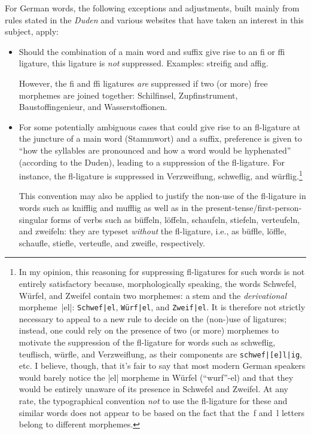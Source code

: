 \documentclass[11pt]{article}
\begin{document}
For German words, the following exceptions and adjustments, built mainly from rules stated in the \emph{Duden} and various websites that have taken an interest in this subject, apply:
\begin{itemize}
\item Should the combination of a main word and suffix give rise to an fi or ffi ligature, this ligature is \emph{not} suppressed. Examples: streifig and affig. 

However, the fi and ffi ligatures \emph{are} suppressed if two (or more) free morphemes are joined together: Schilfinsel, Zupfinstrument, Baustoffingenieur, and Wasserstoffionen.

\item For some potentially ambiguous cases that could give rise to an fl-ligature at the juncture of a main word (Stammwort) and a suffix, preference is given to \enquote{how the syllables are pronounced and how a word would be hyphenated} (according to the Duden), leading to a suppression of the fl-ligature. For instance, the fl-ligature is suppressed in Verzweif\-lung, schweflig, and würflig.\footnote{%
In my opinion, this reasoning for suppressing fl-ligatures for such words is not entirely satisfactory because, morphologically speaking, the words Schwefel, Würfel, and Zweifel contain two morphemes: a stem and the \emph{derivational} morpheme~|el|: \Verb+Schwef|el+, \Verb+Würf|el+, and \Verb+Zweif|el+. It is therefore not strictly necessary to appeal to a new rule to decide on the (non-)use of ligatures; instead, one could rely on the presence of two (or more) morphemes to motivate the suppression of the fl-ligature for words such as schweflig, teuflisch, würfle, and Verzweiflung, as their components are \Verb+schwef|[e]l|ig+, etc. I believe, though, that it's fair to say that most modern German speakers would barely notice the |el| morpheme in Würfel (\enquote{wurf}-el) and that they would be entirely unaware of its presence in Schwefel and Zweifel. At any rate, the typographical convention \emph{not} to use the fl-ligature for these and similar words does not appear to be based on the fact that the~f and~l letters belong to different morphemes.}

This convention may also be applied to justify the non-use of the fl-ligature in words such as knifflig and mufflig as well as in the present-tense/first-person-singular forms of verbs such as büffeln, löffeln, schaufeln, stiefeln, verteufeln, and zweifeln: they are typeset \emph{without} the fl-ligature, i.e., as büffle, löffle, schaufle, stiefle, verteufle, and zweifle, respectively.


\end{itemize}
\end{document}
